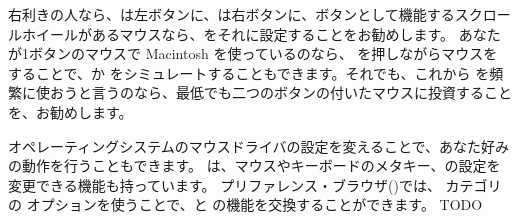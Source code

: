 \documentclass[a4paper,10pt,twoside]{book}
\begin{document}





右利きの人なら、\click は左ボタンに、\actclick は右ボタンに、ボタンとして機能するスクロールホイールがあるマウスなら、\metaclick をそれに設定することをお勧めします。
あなたが1ボタンのマウスで Macintosh を使っているのなら、\clover{} を押しながらマウスを \click することで、\actclick か \metaclick をシミュレートすることもできます。それでも、これから \pharo を頻繁に使おうと言うのなら、最低でも二つのボタンの付いたマウスに投資することを、お勧めします。

オペレーティングシステムのマウスドライバの設定を変えることで、あなた好みの動作を行うこともできます。
\pharo は、マウスやキーボードのメタキー、の設定を変更できる機能も持っています。
プリファレンス・ブラウザ()では、 カテゴリの  オプションを使うことで、\actclick と \metaclick の機能を交換することができます。
TODO
\end{document}
